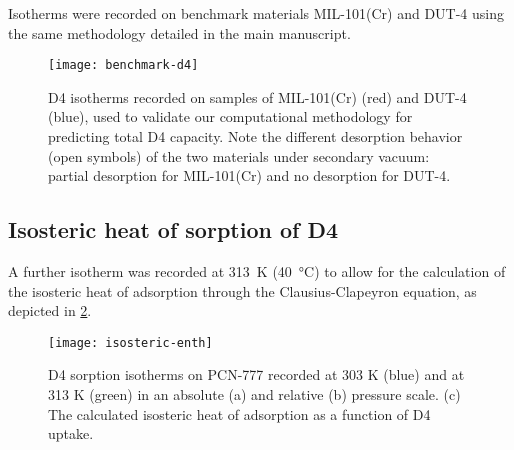 Isotherms were recorded on benchmark materials MIL-101(Cr) and DUT-4 using the
same methodology detailed in the main manuscript.

\begin{figure}[H]
    \centering
    \texttt{[image: benchmark-d4]}
    \caption{%
        D4 isotherms recorded on samples of MIL-101(Cr) (red) and
        DUT-4 (blue), used to validate our computational methodology for
        predicting total D4 capacity. Note the different desorption behavior
        (open symbols) of the two materials under secondary vacuum: partial
        desorption for MIL-101(Cr) and no desorption for DUT-4.
    }\label{fig:d4-benchmark}
\end{figure}

\subsection{Isosteric heat of sorption of D4}\label{isosteric-heat-of-sorption-of-d4}

A further isotherm was recorded at \SI{313}{\kelvin} (\SI{40}{\degreeCelsius})
to allow for the calculation of the isosteric heat of adsorption through the
Clausius-Clapeyron equation, as depicted in \cref{fig:isosteric-enth}.

\begin{figure}[H]
    \centering
    \texttt{[image: isosteric-enth]}
    \caption{%
        D4 sorption isotherms on PCN-777 recorded at 303 K (blue)
        and at 313 K (green) in an absolute (a) and relative (b) pressure scale.
        (c) The calculated isosteric heat of adsorption as a function of D4
        uptake.
    }\label{fig:isosteric-enth}
\end{figure}
